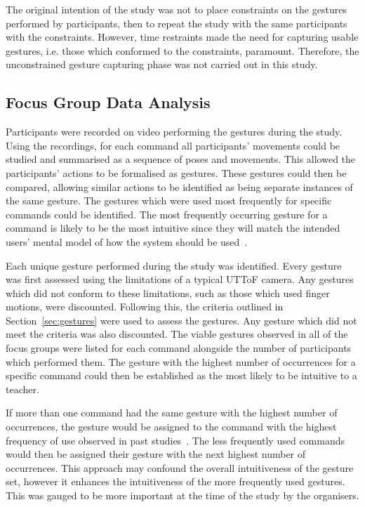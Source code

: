 \documentclass[manuscript, review, screen]{acmart}
\begin{document}
The original intention of the study was not to place constraints on the gestures performed by participants, then to repeat the study with the same participants with the constraints.
However, time restraints made the need for capturing usable gestures, i.e. those which conformed to the constraints, paramount.
Therefore, the unconstrained gesture capturing phase was not carried out in this study.

\subsection{Focus Group Data Analysis}
\label{subsec:analysis}  

Participants were recorded on video performing the gestures during the study.
Using the recordings, for each command all participants' movements could be studied and summarised as a sequence of poses and movements.
This allowed the participants' actions to be formalised as gestures.
These gestures could then be compared, allowing similar actions to be identified as being separate instances of the same gesture.
The gestures which were used most frequently for specific commands could be identified.
The most frequently occurring gesture for a command is likely to be the most intuitive since they will match the intended users' mental model of how the system should be used~\cite{Nielsen2004,Ruiz2011,Wobbrock2009}.

Each unique gesture performed during the study was identified.
Every gesture was first assessed using the limitations of a typical \ac{UTToF} camera.
Any gestures which did not conform to these limitations, such as those which used finger motions, were discounted.
Following this, the criteria outlined in Section~\ref{sec:gestures} were used to assess the gestures.
Any gesture which did not meet the criteria was also discounted.
The viable gestures observed in all of the focus groups were listed for each command alongside the number of participants which performed them.
The gesture with the highest number of occurrences for a specific command could then be established as the most likely to be intuitive to a teacher.

If more than one command had the same gesture with the highest number of occurrences, the gesture would be assigned to the command with the highest frequency of use observed in past studies~\cite{HatchA.HigginsS&Mercier2009}.
The less frequently used commands would then be assigned their gesture with the next highest number of occurrences.
This approach may confound the overall intuitiveness of the gesture set, however it enhances the intuitiveness of the more frequently used gestures.
This was gauged to be more important at the time of the study by the organisers.
\end{document}
